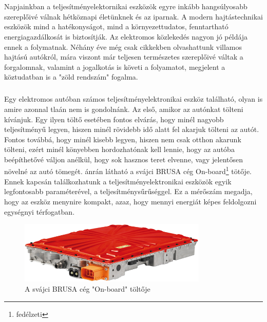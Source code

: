 \chapter*{\bevezeto}

\paragraph{}
Napjainkban a teljesítményelektornikai eszközök egyre inkább hangsúlyosabb szereplőivé válnak hétköznapi életünknek és az iparnak. A modern hajtástechnikai eszközök mind a hatékonyságot, mind a környezettudatos, fenntartható energiagazdálkosát is biztosítják. Az elektromos közlekedés nagyon jó példája ennek a folymatnak. Néhány éve még csak cikkekben olvashattunk villamos hajtású autókról, mára viszont már teljesen természetes szereplőivé váltak a forgalomnak, valamint a jogalkotás is követi a folyamatot, megjelent a köztudatban is a "zöld rendszám" fogalma. 

\paragraph{}
Egy elektromos autóban számos teljesítményelektronikai eszköz található, olyan is amire azonnal tlaán nem is gondolnánk. Az első, amikor az autónkat tölteni kívánjuk. Egy ilyen töltő esetében fontos elvárás, hogy minél nagyobb teljesítményű legyen, hiszen minél rövidebb idő alatt fel akarjuk tölteni az autót. Fontos továbbá, hogy minél kisebb legyen, hiszen nem csak otthon akarunk tölteni, ezért minél könyebben hordozhatónak kell lennie, hogy az autóba beépíthetővé váljon anélkül, hogy sok hasznos teret elvenne, vagy jelentősen növelné az autó tömegét.  ánrán látható a svájci BRUSA cég On-board\footnote{fedélzeti} tötője. Ennek kapcsán találkozhatunk a  teljesítményelektronikai eszközök egyik legfontosabb paraméterével, a teljesítménysűrűséggel. Ez a mérőszám megadja, hogy az eszköz menynire kompakt, azaz, hogy mennyi energiát képes feldolgozni egységnyi térfogatban.

\begin{figure}[!ht]
	\centering
	\includegraphics[width = 0.8\textwidth]{figures/brusa_charger.jpg}
	\caption{A svájci BRUSA cég "On-board" töltője} 
	\label{fig:brusa}
\end{figure}

